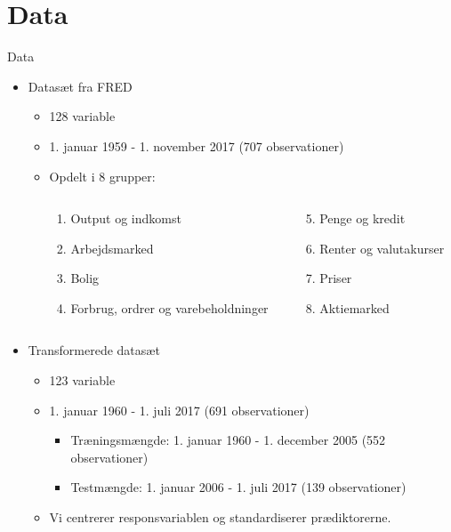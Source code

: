 \section{Data}
\begin{frame}{Data}
\begin{itemize}
\item Datasæt fra FRED
\begin{itemize}
\item 128 variable
\item 1. januar 1959 - 1. november 2017 (707 observationer)
\item Opdelt i 8 grupper:
\begin{columns}
\begin{column}{0.35\textwidth}
    \begin{enumerate}
	\item Output og indkomst 
	\item Arbejdsmarked  
	\item Bolig 
	\item Forbrug, ordrer og varebeholdninger 
\end{enumerate}
\end{column}
\begin{column}{0.35\textwidth} 
    \begin{enumerate}
    \setcounter{enumi}{4}
	\item Penge og kredit 
	\item Renter og valutakurser 
	\item Priser 
	\item Aktiemarked 
\end{enumerate}
\end{column}
\end{columns}
\end{itemize}

\item Transformerede datasæt
\begin{itemize}
\item 123 variable
\item 1. januar 1960 - 1. juli 2017 (691 observationer)
\begin{itemize}
\item Træningsmængde: 1. januar 1960 - 1. december 2005 (552 observationer)
\item Testmængde: 1. januar 2006 - 1. juli 2017 (139 observationer)
\end{itemize}
\item Vi centrerer responsvariablen og standardiserer prædiktorerne.
\end{itemize}
\end{itemize}
\end{frame}

